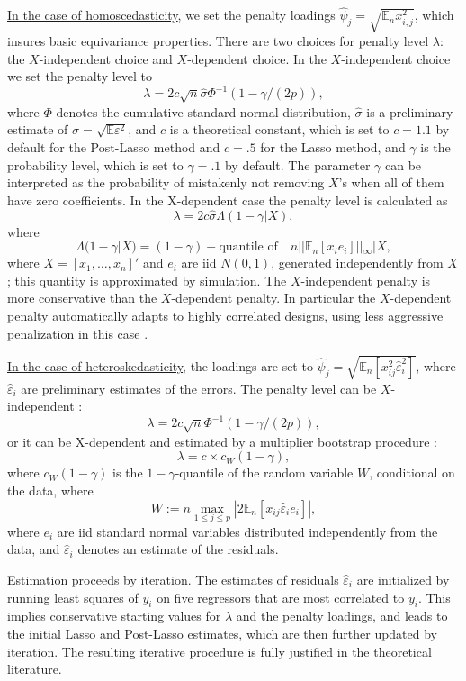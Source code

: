 \documentclass{amsart}\usepackage[]{graphicx}\usepackage[]{color}
\begin{document}
\underline{In the case of homoscedasticity}, we set the penalty loadings $\hat{\psi}_j = \sqrt{\mathbb{E}_n x_{i,j}^2}$, which insures basic equivariance properties. There are two choices for penalty level $\lambda$:  the $X$-independent choice
and $X$-dependent choice.  In the $X$-independent choice we set the penalty level
to
\[ \lambda = 2c \sqrt{n} \hat{\sigma} \Phi^{-1}(1-\gamma/(2p)), \]
where $\Phi$ denotes the cumulative standard normal distribution, 
 $\hat \sigma$ is a preliminary estimate of $\sigma = \sqrt{\mathbb{E} \varepsilon^2}$,
and $c$ is a theoretical constant, which is set to $c=1.1$ by default for the Post-Lasso method and $c=.5$ for the Lasso method, and $\gamma$ is the probability level, which is set to $\gamma =.1$ by default.   The parameter $\gamma$ can be interpreted as the probability of mistakenly not removing $X$'s when all of them have zero coefficients.   In the X-dependent case the penalty level is calculated as
\[ \lambda = 2c \hat{\sigma} \Lambda(1-\gamma|X), \]
where
\[ \Lambda(1-\gamma|X)=(1-\gamma)-\text{quantile of}\quad n||\mathbb{E}_n[x_i e_i] ||_{\infty}|X,\]
where $X=[x_1, \ldots, x_n]'$ and $e_i$ are iid $N(0,1)$, generated independently from $X$; this quantity  is approximated by simulation. The $X$-independent penalty is more conservative than the $X$-dependent penalty. In particular the $X$-dependent penalty automatically adapts to highly correlated designs, using less aggressive penalization in this case \citet{BCH2011:InferenceGauss}.

\underline{In the case of heteroskedasticity}, the loadings are set to $\hat{\psi}_j=\sqrt{\mathbb{E}_n[x_{ij}^2 \hat \varepsilon_i^2]}$, where $\hat \varepsilon_i$ are preliminary estimates of the errors. The penalty level
can be $X$-independent \citep{BCCH12}:
\[ \lambda = 2c \sqrt{n} \Phi^{-1} (1-\gamma/(2p)), \]
or it can be X-dependent and estimated by a multiplier bootstrap procedure \citep{CCK:AOS13}:
\[ \lambda = c \times c_W(1-\gamma), \]
where $c_W(1-\gamma)$ is the $1-\gamma$-quantile of the random variable $W$, conditional on the data, where
\[ W:= n \max_{1 \leq j \leq p} |2\mathbb{E}_n [x_{ij} \hat{\varepsilon}_i e_i]|,\]
where $e_i$ are iid standard normal variables distributed independently from the data, and $ \hat{\varepsilon}_i$ denotes an estimate of the residuals.

Estimation proceeds by iteration.  The estimates of residuals $\hat \varepsilon_i$ are initialized by running least squares of $y_i$ on five regressors that are most correlated to $y_i$. This implies conservative starting values for $\lambda$ and the penalty loadings, and leads to the initial Lasso and Post-Lasso estimates, which are then further updated by iteration.  The resulting iterative procedure is fully justified in the theoretical literature.
\end{document}
